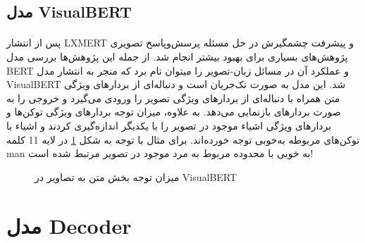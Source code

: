 \subsection{
    مدل VisualBERT \cite{li-etal-2020-bert-vision}
}

\paragraph{}{
    پس از انتشار 
    LXMERT
    و پیشرفت چشمگیرش در حل مسئله پرسش‌وپاسخ تصویری پژوهش‌های بسیاری 
    برای بهبود بیشتر انجام شد. از جمله این پژوهش‌ها بررسی مدل 
    BERT
    و عملکرد آن در مسائل زبان-تصویر را میتوان نام برد که منجر به انتشار مدل
    VisualBERT \cite{li-etal-2020-bert-vision}
    شد. این مدل به صورت تک‌جریان است و دنباله‌ای از بردار‌های ویژگی متن
    همراه با دنباله‌ای از بردارهای ویژگی تصویر را ورودی می‌گیرد و خروجی را
    به صورت بردارهای بازنمایی می‌دهد. به علاوه، میزان توجه 
    بردار‌های ویژگی توکن‌ها و بردار‌های ویژگی اشیاء موجود در تصویر 
    را با یکدیگر اندازه‌گیری کردند و اشیاء با توکن‌های مربوطه به‌خوبی
    توجه خورده‌اند. برای مثال با توجه به شکل 
    \ref{fig:visualbert}
    در لایه 11 کلمه 
    man
    به خوبی با محدوده مربوط به مرد موجود در تصویر مرتبط شده است!
    \begin{figure}[H]
        \caption{میزان توجه بخش متن به تصاویر در VisualBERT}
        \label{fig:visualbert}
    \end{figure}
}

\section{
  مدل Decoder
 }
